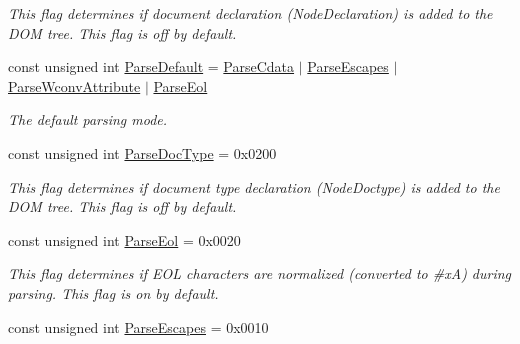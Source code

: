 \begin{DoxyCompactItemize}
\begin{DoxyCompactList}\small\item\em This flag determines if document declaration (NodeDeclaration) is added to the DOM tree. This flag is off by default. \item\end{DoxyCompactList}\item 
const unsigned int \hyperlink{namespaceMezzanine_1_1xml_a0eb617274d4b3cb604f3120bcdaf9850}{ParseDefault} = \hyperlink{namespaceMezzanine_1_1xml_a33da07bddbf04d06d501881b3e13d616}{ParseCdata} $|$ \hyperlink{namespaceMezzanine_1_1xml_a5f0acdde0e19954a8e333b2899708e62}{ParseEscapes} $|$ \hyperlink{namespaceMezzanine_1_1xml_a9e9a386f6a2e7dac28df4b581d8f49b3}{ParseWconvAttribute} $|$ \hyperlink{namespaceMezzanine_1_1xml_a4b763117fdd2d6ff31b21a710f6b4cdd}{ParseEol}
\begin{DoxyCompactList}\small\item\em The default parsing mode. \item\end{DoxyCompactList}\item 
\hypertarget{namespaceMezzanine_1_1xml_aea8775764346a3988ca2aef15beecd5e}{
const unsigned int \hyperlink{namespaceMezzanine_1_1xml_aea8775764346a3988ca2aef15beecd5e}{ParseDocType} = 0x0200}
\label{namespaceMezzanine_1_1xml_aea8775764346a3988ca2aef15beecd5e}

\begin{DoxyCompactList}\small\item\em This flag determines if document type declaration (NodeDoctype) is added to the DOM tree. This flag is off by default. \item\end{DoxyCompactList}\item 
\hypertarget{namespaceMezzanine_1_1xml_a4b763117fdd2d6ff31b21a710f6b4cdd}{
const unsigned int \hyperlink{namespaceMezzanine_1_1xml_a4b763117fdd2d6ff31b21a710f6b4cdd}{ParseEol} = 0x0020}
\label{namespaceMezzanine_1_1xml_a4b763117fdd2d6ff31b21a710f6b4cdd}

\begin{DoxyCompactList}\small\item\em This flag determines if EOL characters are normalized (converted to \#xA) during parsing. This flag is on by default. \item\end{DoxyCompactList}\item 
\hypertarget{namespaceMezzanine_1_1xml_a5f0acdde0e19954a8e333b2899708e62}{
const unsigned int \hyperlink{namespaceMezzanine_1_1xml_a5f0acdde0e19954a8e333b2899708e62}{ParseEscapes} = 0x0010}
\label{namespaceMezzanine_1_1xml_a5f0acdde0e19954a8e333b2899708e62}


\end{DoxyCompactItemize}

